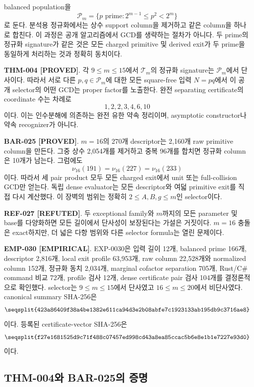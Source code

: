 \documentclass[11pt]{article}
\newcommand{\claimstatus}[2]{\textbf{#1 [#2]}}
\begin{document}
balanced population을
\[
\mathcal P_m=\{p\text{ prime}:2^{m-1}\le p^2<2^m\}
\]
로 둔다. 분석용 정규화에서는 상수 support column을 제거하고 같은
column을 하나로 합친다. 이 과정은 공개 알고리즘에서 GCD를 생략하는
절차가 아니다. 두 prime의 정규화 signature가 같은 것은 모든
charged primitive 및 derived exit가 두 prime을 동일하게 처리하는
것과 정확히 동치이다.

\claimstatus{THM-004}{PROVED}.
각 \(9\le m\le15\)에서 \(\mathcal T_m\)의 정규화 signature는
\(\mathcal P_m\)에서 단사이다. 따라서 서로 다른
\(p,q\in\mathcal P_m\)에 대한 모든 square-free 입력 \(N=pq\)에서
이 공개 selector의 어떤 GCD는 proper factor를 노출한다. 완전
separating certificate의 coordinate 수는 차례로
\[
1,2,2,3,4,6,10
\]
이다. 이는 인수분해에 의존하는 완전 유한 약속 정리이며, asymptotic
constructor나 약속 recognizer가 아니다.

\claimstatus{BAR-025}{PROVED}.
\(m=16\)의 270개 descriptor는 2,160개 raw primitive column을 만든다.
그중 상수 2,054개를 제거하고 중복 96개를 합치면 정규화 column은
10개가 남는다. 그럼에도
\[
\nu_{16}(191)=\nu_{16}(227)=\nu_{16}(233)
\]
이다. 따라서 세 pair product 모두 모든 charged exit에서 unit 또는
full-collision GCD만 얻는다. 독립 dense evaluator는 모든 descriptor와
여덟 primitive exit를 직접 다시 계산했다. 이 장벽의 범위는 정확히
\(2\le A,B,g\le m\)인 selector이다.

\claimstatus{REF-027}{REFUTED}.
두 exceptional family와 \(m\)까지의 모든 parameter 및 base를
다양화하면 모든 길이에서 단사성이 보장된다는 가설은 거짓이다.
\(m=16\) 충돌은 exact하지만, 더 넓은 다항 범위와 다른 selector
formula는 열린 문제이다.

\claimstatus{EMP-030}{EMPIRICAL}.
EXP-0030은 입력 길이 12개, balanced prime 166개, descriptor 2,816개,
local exit profile 63,953개, raw column 22,528개와 normalized column
152개, 정규화 동치 2,034개, marginal cofactor separation 705개,
Rust/C\# command 비교 72개, profile 검사 12개, dense certificate
pair 검사 104개를 결정론적으로 확인했다. selector는
\(9\le m\le15\)에서 단사였고 \(16\le m\le20\)에서 비단사였다.
canonical summary SHA-256은
\[
\texttt{\seqsplit{423a86409f38a4be1382e611ca94d3e2b08abfe7c1923133ab195db9c3716ae8}}
\]
이다.
등록된 certificate-vector SHA-256은
\[
\texttt{\seqsplit{f27e1681525d9c71f488c07457ed998cd43a8ea85ccac5b6e8e1b1e7227e93d0}}
\]
이다.

\subsection{THM-004와 BAR-025의 증명}
\end{document}
